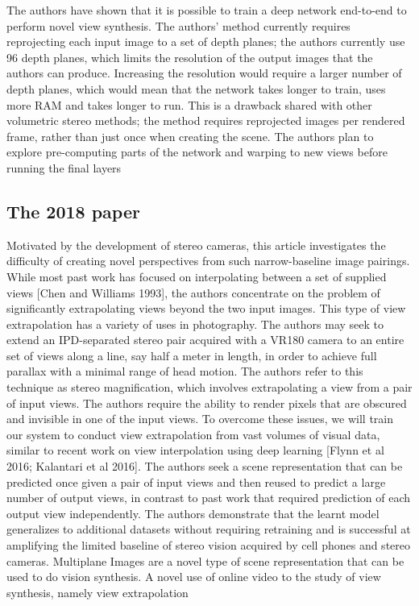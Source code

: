 The authors have shown that it is possible to train a deep network end-to-end to perform novel view synthesis. The authors' method currently requires reprojecting each input image to a set of depth planes; the authors currently use 96 depth planes, which limits the resolution of the output images that the authors can produce. Increasing the resolution would require a larger number of depth planes, which would mean that the network takes longer to train, uses more RAM and takes longer to run. This is a drawback shared with other volumetric stereo methods; the method requires reprojected images per rendered frame, rather than just once when creating the scene. The authors plan to explore pre-computing parts of the network and warping to new views before running the final layers

 \subsection{The 2018 paper}\label{subsec2:2018}

Motivated by the development of stereo cameras, this article investigates the difficulty of creating novel perspectives from such narrow-baseline image pairings. While most past work has focused on interpolating between a set of supplied views [Chen and Williams 1993], the authors concentrate on the problem of significantly extrapolating views beyond the two input images. This type of view extrapolation has a variety of uses in photography. The authors may seek to extend an IPD-separated stereo pair acquired with a VR180 camera to an entire set of views along a line, say half a meter in length, in order to achieve full parallax with a minimal range of head motion. The authors refer to this technique as stereo magnification, which involves extrapolating a view from a pair of input views. The authors require the ability to render pixels that are obscured and invisible in one of the input views. To overcome these issues, we will train our system to conduct view extrapolation from vast volumes of visual data, similar to recent work on view interpolation using deep learning [Flynn et al 2016; Kalantari et al 2016]. The authors seek a scene representation that can be predicted once given a pair of input views and then reused to predict a large number of output views, in contrast to past work that required prediction of each output view independently. The authors demonstrate that the learnt model generalizes to additional datasets without requiring retraining and is successful at amplifying the limited baseline of stereo vision acquired by cell phones and stereo cameras. Multiplane Images are a novel type of scene representation that can be used to do vision synthesis. A novel use of online video to the study of view synthesis, namely view extrapolation

